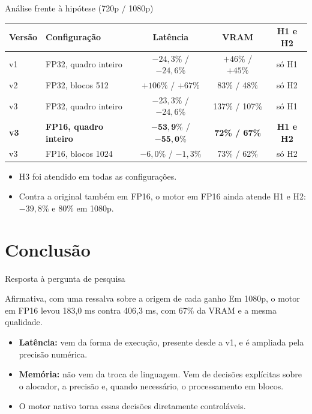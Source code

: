 \documentclass[
    aspectratio=169,
    12pt,
    brazil,
    xcolor=table
]{beamer}
\newcommand{\nota}[1]{\par\vspace{3pt}{\scriptsize #1\par}}
\newcommand{\reflimiares}{Limiares: H1, redução de pelo menos 10\% na latência; H2, no máximo 90\% da VRAM da original.}
\begin{document}
\begin{frame}{Análise frente à hipótese (720p / 1080p)}
  \centering
  \small
  \renewcommand{\arraystretch}{1.2}
  \begin{tabular}{llccc}
    \toprule
    \textbf{Versão} & \textbf{Configuração} & \textbf{Latência} & \textbf{VRAM} & \textbf{H1 e H2} \\
    \midrule
    v1 & FP32, quadro inteiro & $-24{,}3\%$ / $-24{,}6\%$ & $+46\%$ / $+45\%$ & só H1 \\
    v2 & FP32, blocos 512 & $+106\%$ / $+67\%$ & 83\% / 48\% & só H2 \\
    v3 & FP32, quadro inteiro & $-23{,}3\%$ / $-24{,}6\%$ & 137\% / 107\% & só H1 \\
    \rowcolor{senacblue!15}
    \textbf{v3} & \textbf{FP16, quadro inteiro} & $\mathbf{-53{,}9\%}$ / $\mathbf{-55{,}0\%}$ & \textbf{72\% / 67\%} & \textbf{H1 e H2} \\
    v3 & FP16, blocos 1024 & $-6{,}0\%$ / $-1{,}3\%$ & 73\% / 62\% & só H2 \\
    \bottomrule
  \end{tabular}
  \nota{Em relação à original em FP32. Na v1, a VRAM é a variação do pico; nas demais, a fração do pico da original. \reflimiares}
  \raggedright\small
  \begin{itemize}
    \item H3 foi atendido em todas as configurações.
    \item Contra a original também em FP16, o motor em FP16 ainda atende H1 e H2: $-39{,}8\%$ e 80\% em 1080p.
  \end{itemize}
\end{frame}

\section{Conclusão}
\begin{frame}{Resposta à pergunta de pesquisa}
  \begin{block}{Afirmativa, com uma ressalva sobre a origem de cada ganho}
    Em 1080p, o motor em FP16 levou 183,0 ms contra 406,3 ms, com 67\% da VRAM e a mesma qualidade.
  \end{block}
  \vspace{4pt}
  \small
  \begin{itemize}
    \item \textbf{Latência:} vem da forma de execução, presente desde a v1, e é ampliada pela precisão numérica.
    \item \textbf{Memória:} não vem da troca de linguagem. Vem de decisões explícitas sobre o alocador, a precisão e, quando necessário, o processamento em blocos.
    \item O motor nativo torna essas decisões diretamente controláveis.
  \end{itemize}
\end{frame}
\end{document}

